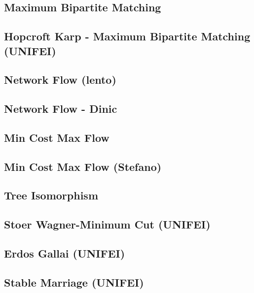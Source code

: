 \subsection{Maximum Bipartite Matching}
\raggedbottom
\hrulefill
\subsection{Hopcroft Karp - Maximum Bipartite Matching (UNIFEI)}
\raggedbottom
\hrulefill
\subsection{Network Flow (lento)}
\raggedbottom
\hrulefill
\subsection{Network Flow - Dinic}
\raggedbottom
\hrulefill
\subsection{Min Cost Max Flow}
\raggedbottom
\hrulefill
\subsection{Min Cost Max Flow (Stefano)}
\raggedbottom
\hrulefill
\subsection{Tree Isomorphism}
\raggedbottom
\hrulefill
\subsection{Stoer Wagner-Minimum Cut (UNIFEI)}
\raggedbottom
\hrulefill
\subsection{Erdos Gallai (UNIFEI)}
\raggedbottom
\hrulefill
\subsection{Stable Marriage (UNIFEI)}
\raggedbottom
\hrulefill
